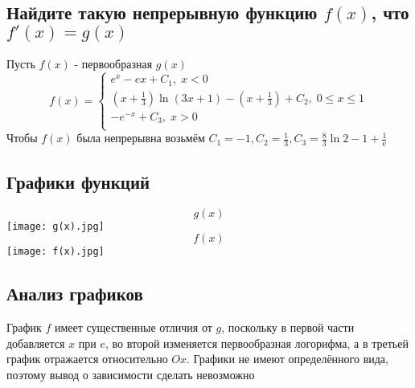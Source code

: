 \documentclass{article}
\begin{document}
    \subsection{Найдите такую непрерывную функцию $f (x)$, что $f'(x) = g(x)$}
    Пусть $f(x)$ - первообразная $g(x)$\\
    \begin{equation*}
    f(x) = 
    \begin{cases}
        e^x-ex + C_1, \;x < 0 \\
        (x+\frac{1}{3})\ln{(3x+1)} - (x + \frac{1}{3}) + C_2, \;0 \leq x \leq 1 \\
        -e^{-x} + C_3, \;x > 0 \\
    \end{cases}
    \end{equation*}
    Чтобы $f(x)$ была непрерывна возьмём $C_1=-1 , C_2= \frac{1}{3} , C_3= \frac{8}{3} \ln{2} - 1 + \frac{1}{\text{e}}$

    \subsection{Графики функций}
    \begin{equation*}
       g(x) 
    \end{equation*}
    \texttt{[image: g(x).jpg]}\newpage
    \begin{equation*}
        f(x)
    \end{equation*}
    \texttt{[image: f(x).jpg]}
    \subsection{Анализ графиков}
    График $f$ имеет существенные отличия от $g$, поскольку в первой части добавляется $x$ при $e$, во второй изменяется первообразная логорифма, а в третьей график отражается относительно $Ox$. Графики не имеют определённого вида, поэтому вывод о зависимости сделать невозможно        

    
\newpage
\end{document}

